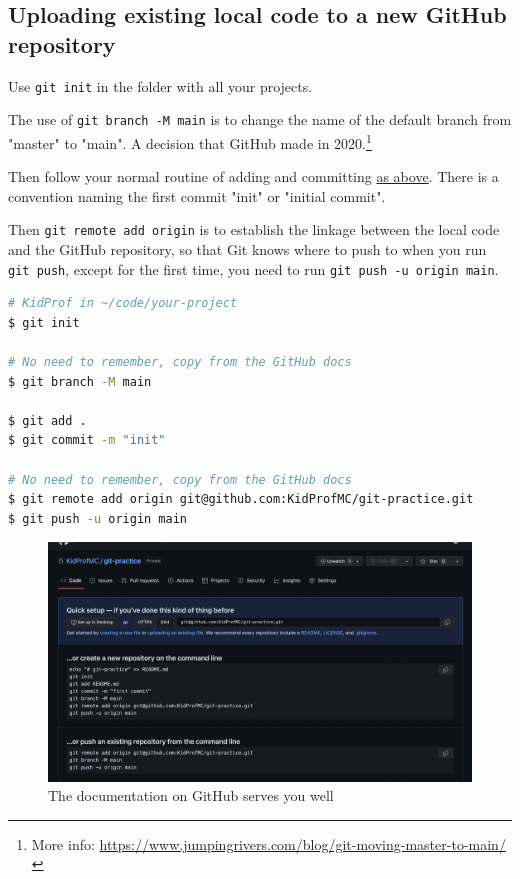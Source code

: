 \subsection{Uploading existing local code to a new GitHub repository}

Use \texttt{git init} in the folder with all your projects.

The use of \texttt{git branch -M main} is to change the name of the default branch from "master" to "main". A decision that GitHub made in 2020.\footnote{More info: \url{https://www.jumpingrivers.com/blog/git-moving-master-to-main/}}

Then follow your normal routine of adding and committing \hyperref[sec:gcmsg]{as above}. There is a convention naming the first commit "init" or "initial commit".

Then \texttt{git remote add origin} is to establish the linkage between the local code and the GitHub repository, so that Git knows where to push to when you run \texttt{git push}, except for the first time, you need to run \texttt{git push -u origin main}.

\begin{lstlisting}[language=bash]
# KidProf in ~/code/your-project
$ git init

# No need to remember, copy from the GitHub docs
$ git branch -M main 

$ git add .
$ git commit -m "init"

# No need to remember, copy from the GitHub docs
$ git remote add origin git@github.com:KidProfMC/git-practice.git
$ git push -u origin main
\end{lstlisting}

\begin{figure}[h]
\centering
\includegraphics[width=15cm]{images/ch3-newrepocode.png}
\caption{The documentation on GitHub serves you well}
\end{figure}


